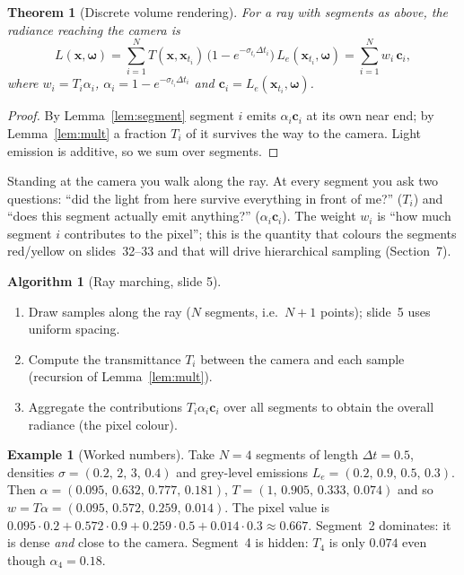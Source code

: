 \documentclass[11pt,a4paper]{article}
\newcommand{\om}{\boldsymbol{\omega}}
\newcommand{\cc}{\boldsymbol{c}}
\newcommand{\xx}{\boldsymbol{x}}
\newcommand{\Le}{L_e}
\theoremstyle{definition}
\newtheorem{example}[definition]{Example}
\newtheorem{algorithm}{Algorithm}[section]
\theoremstyle{plain}
\newtheorem{theorem}[definition]{Theorem}
\theoremstyle{remark}
\begin{document}
\begin{theorem}[Discrete volume rendering]\label{thm:render}
For a ray with segments as above, the radiance reaching the camera is
\[
L(\xx,\om)=\sum_{i=1}^{N}T(\xx,\xx_{t_i})\,\big(1-e^{-\sigma_{t_i}\Delta t_i}\big)\,\Le(\xx_{t_i},\om)
=\sum_{i=1}^{N}w_i\,\cc_i,
\]
where $w_i=T_i\alpha_i$, $\alpha_i=1-e^{-\sigma_{t_i}\Delta t_i}$ and $\cc_i=\Le(\xx_{t_i},\om)$.
\end{theorem}
\begin{proof}
By Lemma~\ref{lem:segment} segment $i$ emits $\alpha_i\cc_i$ at its own near end; by Lemma~\ref{lem:mult} a fraction $T_i$ of it survives the way to the camera. Light emission is additive, so we sum over segments.
\end{proof}

\begin{intuition}
Standing at the camera you walk along the ray. At every segment you ask two questions: ``did the light from here survive everything in front of me?'' ($T_i$) and ``does this segment actually emit anything?'' ($\alpha_i\cc_i$). The weight $w_i$ is ``how much segment $i$ contributes to the pixel''; this is the quantity that colours the segments red/yellow on slides~32--33 and that will drive hierarchical sampling (Section~7).
\end{intuition}

\begin{algorithm}[Ray marching, slide 5]\label{alg:march}
\begin{enumerate}[nosep]
\item Draw samples along the ray ($N$ segments, i.e.\ $N+1$ points); slide~5 uses uniform spacing.
\item Compute the transmittance $T_i$ between the camera and each sample (recursion of Lemma~\ref{lem:mult}).
\item Aggregate the contributions $T_i\alpha_i\cc_i$ over all segments to obtain the overall radiance (the pixel colour).
\end{enumerate}
\end{algorithm}

\begin{example}[Worked numbers]\label{ex:toy}
Take $N=4$ segments of length $\Delta t=0.5$, densities $\sigma=(0.2,\,2,\,3,\,0.4)$ and grey-level emissions $\Le=(0.2,\,0.9,\,0.5,\,0.3)$.
Then $\alpha=(0.095,\,0.632,\,0.777,\,0.181)$, $T=(1,\,0.905,\,0.333,\,0.074)$ and so $w=T\alpha=(0.095,\,0.572,\,0.259,\,0.014)$. The pixel value is
$0.095\cdot0.2+0.572\cdot0.9+0.259\cdot0.5+0.014\cdot0.3\approx0.667$.
Segment~2 dominates: it is dense \emph{and} close to the camera. Segment~4 is hidden: $T_4$ is only $0.074$ even though $\alpha_4=0.18$.
\end{example}
\end{document}
